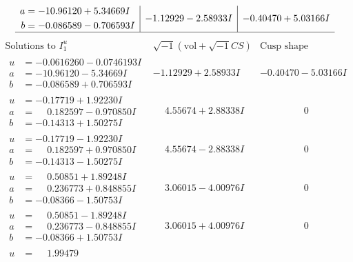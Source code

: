 \documentclass[1p]{elsarticle_modified}
\theoremstyle{definition}
\newcommand{\I}{\sqrt{-1}}
\begin{document}
$$\begin{array}{c|c|c}
\begin{aligned}
a &= -10.96120 + 5.34669 I \\
b &= -0.086589 - 0.706593 I\end{aligned}
 & -1.12929 - 2.58933 I & -0.40470 + 5.03166 I\\
 \hline 
 \end{array}$$\newpage$$\begin{array}{c|c|c}  
\text{Solutions to }I^u_{1}& \I (\text{vol} + \sqrt{-1}CS) & \text{Cusp shape}\\
 \hline 
\begin{aligned}
u &= -0.0616260 - 0.0746193 I \\
a &= -10.96120 - 5.34669 I \\
b &= -0.086589 + 0.706593 I\end{aligned}
 & -1.12929 + 2.58933 I & -0.40470 - 5.03166 I \\ \hline\begin{aligned}
u &= -0.17719 + 1.92230 I \\
a &= \phantom{-}0.182597 - 0.970850 I \\
b &= -0.14313 + 1.50275 I\end{aligned}
 & \phantom{-}4.55674 + 2.88338 I & \phantom{-0.000000 } 0 \\ \hline\begin{aligned}
u &= -0.17719 - 1.92230 I \\
a &= \phantom{-}0.182597 + 0.970850 I \\
b &= -0.14313 - 1.50275 I\end{aligned}
 & \phantom{-}4.55674 - 2.88338 I & \phantom{-0.000000 } 0 \\ \hline\begin{aligned}
u &= \phantom{-}0.50851 + 1.89248 I \\
a &= \phantom{-}0.236773 + 0.848855 I \\
b &= -0.08366 - 1.50753 I\end{aligned}
 & \phantom{-}3.06015 - 4.00976 I & \phantom{-0.000000 } 0 \\ \hline\begin{aligned}
u &= \phantom{-}0.50851 - 1.89248 I \\
a &= \phantom{-}0.236773 - 0.848855 I \\
b &= -0.08366 + 1.50753 I\end{aligned}
 & \phantom{-}3.06015 + 4.00976 I & \phantom{-0.000000 } 0 \\ \hline\begin{aligned}
u &= \phantom{-}1.99479\phantom{ +0.000000I} \\

\end{aligned}
\end{array}$$
\end{document}
